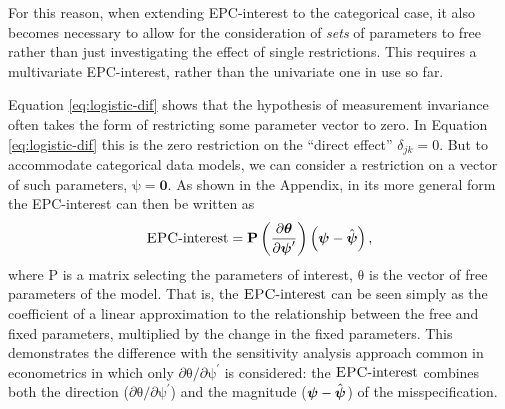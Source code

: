 \documentclass[letterpaper,12pt]{article}
\newcommand\vm[1]{%
\bm{\mathrm{#1}}}
\newcommand{\param}{\vm{\theta}}
\newcommand{\bpsi}{\vm{\psi}}
\newcommand{\da}{\textrm{{\sc {EPC}}-interest}}
\begin{document}
For this reason, when extending EPC-interest to the categorical case, it also becomes necessary to allow for the consideration of \emph{sets} of parameters to free rather than just investigating the effect of single restrictions. This requires a multivariate EPC-interest, rather than the univariate one in use so far. 

Equation \ref{eq:logistic-dif} shows that the hypothesis of measurement invariance often takes the form of restricting some parameter vector to zero. In Equation \ref{eq:logistic-dif} this is the zero restriction on the ``direct effect'' $\delta_{jk}=0$. But to accommodate categorical data models, we can consider a restriction on a vector of such parameters, $\bpsi=\mathbf{0}$.
As shown in the Appendix, in its more general form the EPC-interest can then be written as 
\begin{equation}
	\da = \vm{P} \left( \frac{\partial \param} {\partial \bpsi^\prime} \right) \left( \bpsi - \hat{\bpsi}\right),
	\label{eq:epc-linear}
\end{equation}
where $\vm{P}$ is a matrix selecting the parameters of interest, $\param$ is the vector of free parameters of the model.
That is, the $\da{}$ can be seen simply as the coefficient of a linear approximation to the relationship between the free and fixed parameters, multiplied by the change in the fixed parameters. This demonstrates the difference with the sensitivity analysis approach common in econometrics \citep[p. 168]{magnus2007local} in which only $\partial \param / \partial \bpsi^\prime$ is considered: the $\da{}$ combines both the direction ($\partial \param / \partial \bpsi^\prime$) and the magnitude ($ \bpsi - \hat{\bpsi}$) of the misspecification.

\end{document}
